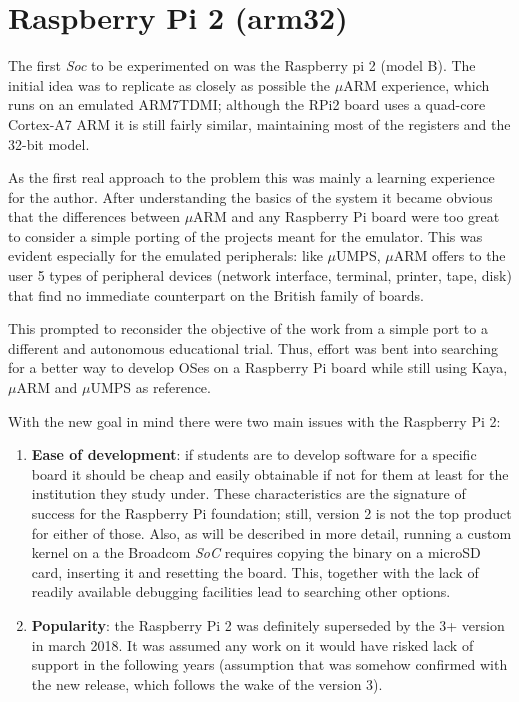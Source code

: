 \documentclass[12pt,a4paper,openright,twoside]{report}
\begin{document}
\section{Raspberry Pi 2 (arm32)}
The first \textit{Soc} to be experimented on was the Raspberry pi 2 (model B).
 The initial idea was to replicate as closely as possible the
$\mu$ARM experience, which runs on an emulated ARM7TDMI; although the RPi2 
board uses a quad-core Cortex-A7 ARM it is still fairly similar, maintaining most
of the registers and the 32-bit model.

As the first real approach to the problem this was mainly a learning experience
for the author. After understanding the basics of the system it became
obvious that the differences between $\mu$ARM and any Raspberry Pi board were 
too great to consider a simple porting of the projects meant for the emulator.
This was evident especially for the emulated peripherals: like $\mu$UMPS, $\mu$ARM offers
to the user 5 types of peripheral devices (network interface, terminal, printer,
tape, disk) that find no immediate counterpart on the British family of boards.

This prompted to reconsider the objective of the work from a simple port to
a different and autonomous educational trial. Thus, effort was bent into searching
for a better way to develop OSes on a Raspberry Pi board while still using
Kaya, $\mu$ARM and $\mu$UMPS as reference.

With the new goal in mind there were two main issues with the Raspberry Pi 2:
\begin{enumerate}
    \item \textbf{Ease of development}: if students are to develop software
            for a specific board it should be cheap and easily obtainable if 
            not for them at least for the institution they study under.
            These characteristics are the signature of success for the Raspberry Pi
            foundation; still, version 2 is not the top product for either of
            those.
            Also, as will be described in more detail, running a custom kernel 
            on a the Broadcom \textit{SoC} requires copying the binary on a 
            microSD card, inserting it and resetting the board. This, together
            with the lack of readily available debugging facilities lead to searching
            other options.
    \item \textbf{Popularity}: the Raspberry Pi 2 was definitely superseded by the
            3+ version in march 2018. It was assumed any work on it would have
            risked lack of support in the following years (assumption that was
            somehow confirmed with the new release, which follows the wake of 
            the version 3).
\end{enumerate}
\end{document}
